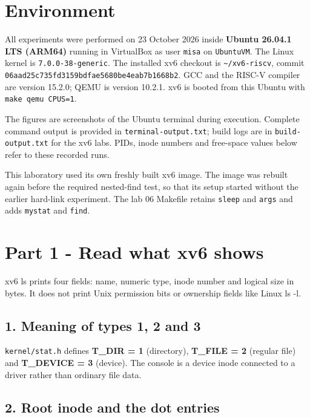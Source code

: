 \section{Environment}

All experiments were performed on 23 October 2026 inside \textbf{Ubuntu 26.04.1 LTS (ARM64)} running in VirtualBox as user \texttt{misa} on \texttt{UbuntuVM}. The Linux kernel is \texttt{7.0.0-38-generic}. The installed xv6 checkout is \texttt{\textasciitilde{}/\allowbreak{}xv6-riscv}, commit \texttt{06aad25c\allowbreak{}735fd315\allowbreak{}9bdfae56\allowbreak{}80be4eab\allowbreak{}7b1668b2}. GCC and the RISC-V compiler are version 15.2.0; QEMU is version 10.2.1. xv6 is booted from this Ubuntu with \texttt{make qemu CPUS=1}.

The figures are screenshots of the Ubuntu terminal during execution. Complete command output is provided in \texttt{terminal-output.txt}; build logs are in \texttt{build-output.txt} for the xv6 labs. PIDs, inode numbers and free-space values below refer to these recorded runs.

This laboratory used its own freshly built xv6 image. The image was rebuilt again before the required nested-find test, so that its setup started without the earlier hard-link experiment. The lab 06 Makefile retains \texttt{sleep} and \texttt{args} and adds \texttt{mystat} and \texttt{find}.

\section{Part 1 - Read what xv6 shows}

xv6 ls prints four fields: name, numeric type, inode number and logical size in bytes. It does not print Unix permission bits or ownership fields like Linux ls -l.

\subsection{1. Meaning of types 1, 2 and 3}

\texttt{kernel/\allowbreak{}stat.h} defines \textbf{T\_DIR = 1} (directory), \textbf{T\_FILE = 2} (regular file) and \textbf{T\_DEVICE = 3} (device). The console is a device inode connected to a driver rather than ordinary file data.

\subsection{2. Root inode and the dot entries}

